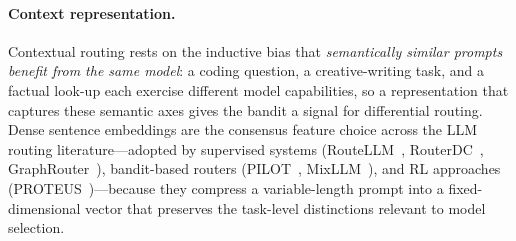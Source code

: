 \paragraph{Context representation.}
Contextual routing rests on the inductive bias that \emph{semantically similar prompts benefit from the same model}: a coding question, a creative-writing task, and a factual look-up each exercise different model capabilities, so a representation that captures these semantic axes gives the bandit a signal for differential routing.
Dense sentence embeddings are the consensus feature choice across the LLM routing literature---adopted by supervised systems (RouteLLM~\cite{ong2024routellm}, RouterDC~\cite{chen2024routerdc}, GraphRouter~\cite{feng2025graphrouter}), bandit-based routers (PILOT~\cite{panda2025pilot}, MixLLM~\cite{wang2025mixllm}), and RL approaches (PROTEUS~\cite{bhatti2026proteus})---because they compress a variable-length prompt into a fixed-dimensional vector that preserves the task-level distinctions relevant to model selection.

